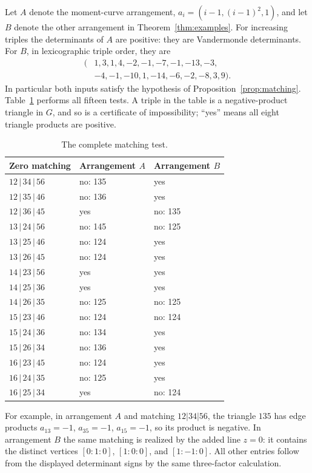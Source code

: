 \documentclass[11pt]{article}
\theoremstyle{definition}\newtheorem{definition}[theorem]{Definition}
\begin{document}
Let $A$ denote the moment-curve arrangement, $a_i=(i-1,(i-1)^2,1)$,
and let $B$ denote the other arrangement in
Theorem~\ref{thm:examples}. For increasing triples the determinants
of $A$ are positive: they are Vandermonde determinants.
For $B$, in lexicographic triple order, they are
\[
\begin{split}
 (&1,3,1,4,-2,-1,-7,-1,-13,-3,\\
  &-4,-1,-10,1,-14,-6,-2,-8,3,9).
\end{split}
\]
In particular both inputs satisfy the hypothesis of
Proposition~\ref{prop:matching}. Table~\ref{tab:matchings} performs
all fifteen tests. A triple in the table is a negative-product
triangle in $G$, and so is a certificate of impossibility; ``yes''
means all eight triangle products are positive.

\begin{table}[htbp]\centering\small
\begin{tabular}{lll}\toprule
Zero matching & Arrangement $A$ & Arrangement $B$\\\midrule
 $12\,|\,34\,|\,56$ & no: 135 & yes\\
 $12\,|\,35\,|\,46$ & no: 136 & yes\\
 $12\,|\,36\,|\,45$ & yes & no: 135\\
 $13\,|\,24\,|\,56$ & no: 145 & no: 125\\
 $13\,|\,25\,|\,46$ & no: 124 & yes\\
 $13\,|\,26\,|\,45$ & no: 124 & yes\\
 $14\,|\,23\,|\,56$ & yes & yes\\
 $14\,|\,25\,|\,36$ & yes & yes\\
 $14\,|\,26\,|\,35$ & no: 125 & no: 125\\
 $15\,|\,23\,|\,46$ & no: 124 & no: 124\\
 $15\,|\,24\,|\,36$ & no: 134 & yes\\
 $15\,|\,26\,|\,34$ & no: 136 & yes\\
 $16\,|\,23\,|\,45$ & no: 124 & yes\\
 $16\,|\,24\,|\,35$ & no: 125 & yes\\
 $16\,|\,25\,|\,34$ & yes & no: 124\\
\bottomrule\end{tabular}
\caption{The complete matching test.}\label{tab:matchings}
\end{table}

For example, in arrangement $A$ and matching $12|34|56$, the triangle
$135$ has edge products $a_{13}=-1$, $a_{35}=-1$, $a_{15}=-1$,
so its product is negative. In arrangement $B$ the same matching is
realized by the added line $z=0$: it contains the distinct vertices
$[0:1:0]$, $[1:0:0]$, and $[1:-1:0]$.
All other entries follow from the displayed determinant signs by
the same three-factor calculation.
\end{document}
